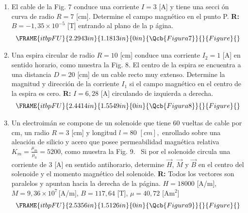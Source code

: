 \documentclass[12pt]{article}
\begin{document}
\begin{enumerate}
\item El cable de la Fig. 7 conduce una corriente $I=3$ [A] y tiene una secci%
\'{o}n curva de radio $R=7$ [cm]. Determine el campo magn\'{e}tico en el
punto P. \textbf{R: }$B=-1,35\times 10^{-5}$ [T] entrando al plano de la p%
\'{a}gina. 
\begin{equation*}
\FRAME{itbpFU}{2.2943in}{1.1813in}{0in}{\Qcb{Figura 7}}{}{Figure}{\special%
{language "Scientific Word";type "GRAPHIC";maintain-aspect-ratio
TRUE;display "USEDEF";valid_file "T";width 2.2943in;height 1.1813in;depth
0in;original-width 4.5403in;original-height 2.3246in;cropleft "0";croptop
"1";cropright "1";cropbottom "0";tempfilename
'R3IG7X07.wmf';tempfile-properties "XPR";}}
\end{equation*}

\item Una espira circular de radio $R=10$ [cm] conduce una corriente $%
I_{2}=1 $ [A] en sentido horario, como muestra la Fig. 8. El centro de la
espira se encuentra a una distancia $D=20$ [cm] de un cable recto muy
extenso. Determine la magnitud y direcci\'{o}n de la corriente $I_{1}$ si el
campo magn\'{e}tico en el centro de la espira es cero. \textbf{R: }$I=6,28$
[A] circulando de izquierda a derecha.%
\begin{equation*}
\FRAME{itbpFU}{2.4414in}{1.5549in}{0in}{\Qcb{Figura 8}}{}{Figure}{\special%
{language "Scientific Word";type "GRAPHIC";maintain-aspect-ratio
TRUE;display "USEDEF";valid_file "T";width 2.4414in;height 1.5549in;depth
0in;original-width 4.6648in;original-height 2.9611in;cropleft "0";croptop
"1";cropright "1";cropbottom "0";tempfilename
'R3IG7X08.wmf';tempfile-properties "XPR";}}
\end{equation*}

\item Un electroim\'{a}n se compone de un solenoide que tiene 60 vueltas de
cable por cm, un radio $R=3$ [cm] y longitud $l=80$ $[cm],$ enrollado sobre
una aleaci\'{o}n de silicio y acero que posee permeabilidad magn\'{e}tica
relativa $K_{m}=\frac{\mu _{m}}{\mu _{0}}=5200$, como muestra la Fig. 9. \
Si por el solenoide circula una corriente de $3$ [A] en sentido antihorario,
determine $\vec{H}$, $\vec{M}$ y $\vec{B}$ en el centro del solenoide y el
momento magn\'{e}tico del solenoide. \textbf{R: }Todos los vectores son
paralelos y apuntan hacia la derecha de la p\'{a}gina. $H=18000$ [A/m], $%
M=9,36\times 10^{7}\,$[A/m], $B=117,64$ [T], $\mu =40,72$ [Am$^{2}$]%
\begin{equation*}
\FRAME{itbpFU}{2.5356in}{1.5126in}{0in}{\Qcb{Figura 9}}{}{Figure}{\special%
{language "Scientific Word";type "GRAPHIC";maintain-aspect-ratio
TRUE;display "USEDEF";valid_file "T";width 2.5356in;height 1.5126in;depth
0in;original-width 4.3734in;original-height 2.5962in;cropleft "0";croptop
"1";cropright "1";cropbottom "0";tempfilename
'R3IG7Y09.wmf';tempfile-properties "XPR";}}
\end{equation*}
\end{enumerate}
\end{document}
